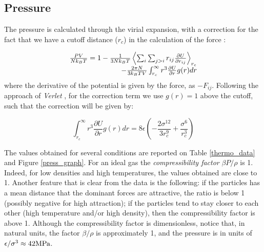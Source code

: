 \documentclass[aps,prl,reprint,groupedaddress]{revtex4-1}
\begin{document}
\subsection{Pressure}

The pressure is calculated through the virial expansion, with a correction for the fact that we have a cutoff distance ($r_c$) in the calculation of the force \cite{ICCPBook}:

\begin{equation}
\begin{array}{r r}
  \frac{PV}{N k_B T} = 1 - \frac{1}{3Nk_BT}\left\langle \sum_i \sum_{j>i} r_{ij} \frac{\partial U}{\partial r_{ij}} \right\rangle_{r_c} \\
   - \frac{2\pi N}{3k_BTV}\int_{r_c}^{\infty} r^3 \frac{\partial U}{\partial r} g(r) dr
\end{array}
\end{equation}
where the derivative of the potential is given by the force, as $-F_{ij}$. Following the approach of \textit{Verlet} \cite{Verlet1967}, for the correction term we use $g(r) = 1$ above the cutoff, such that the correction will be given by:

\begin{equation}
  \int_{r_c}^{\infty} r^3 \frac{\partial U}{\partial r} g(r) dr = 8 \epsilon \left( -\frac{2 \sigma^{12}}{3r_c^{9}} + \frac{\sigma^6}{r_c^3} \right)
\end{equation}

The values obtained for several conditions are reported on Table \ref{thermo_data} and Figure \ref{press_graph}. For an ideal gas the \textit{compressibility factor} $\beta P/\rho$ is 1. Indeed, for low densities and high temperatures, the values obtained are close to 1. Another feature that is clear from the data is the following: if the particles has a mean distance that the dominant forces are attractive, the ratio is below 1 (possibly negative for high attraction); if the particles tend to stay closer to each other (high temperature and/or high density), then the compressibility factor is above 1. Although the compressibility factor is dimensionless, notice that, in natural units, the factor $\beta / \rho$ is approximately 1, and the pressure is in units of $\epsilon/\sigma^3 \approx 42 \textup{MPa}$.
\end{document}
